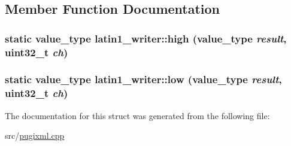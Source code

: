 \subsection{Member Function Documentation}
\hypertarget{structlatin1__writer_a0e48c306ebe556f267404a9624f00554}{
\subsubsection[{high}]{\setlength{\rightskip}{0pt plus 5cm}static {\bf value\_\-type} latin1\_\-writer::high ({\bf value\_\-type} {\em result}, \/  uint32\_\-t {\em ch})}}
\label{structlatin1__writer_a0e48c306ebe556f267404a9624f00554}
\hypertarget{structlatin1__writer_ab5d7a833d29d66031420686ca67b1f6e}{
\subsubsection[{low}]{\setlength{\rightskip}{0pt plus 5cm}static {\bf value\_\-type} latin1\_\-writer::low ({\bf value\_\-type} {\em result}, \/  uint32\_\-t {\em ch})}}
\label{structlatin1__writer_ab5d7a833d29d66031420686ca67b1f6e}


The documentation for this struct was generated from the following file:\begin{DoxyCompactItemize}
\item 
src/\hyperlink{pugixml_8cpp}{pugixml.cpp}\end{DoxyCompactItemize}
